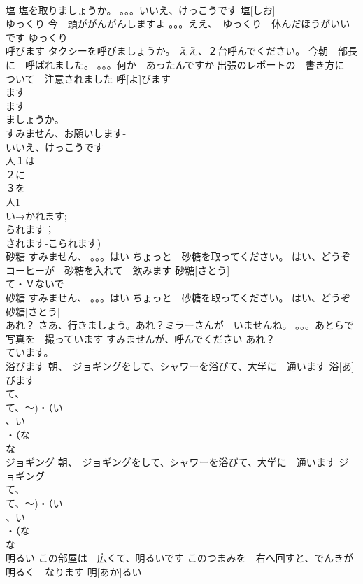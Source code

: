 \documentclass[8pt]{extreport}
\begin{document}
\begin{CJK}{UTF8}{min}
\\	塩	塩を取りましょうか。 。。。いいえ、けっこうです	塩[しお]					
\\	ゆっくり	今　頭ががんがんしますよ 。。。ええ、　ゆっくり　休んだほうがいいです	ゆっくり			
\\	呼びます	タクシーを呼びましょうか。 ええ、２台呼んでください。 今朝　部長に　呼ばれました。 。。。何か　あったんですか 出張のレポートの　書き方に　ついて　注意されました	呼[よ]びます			
\\	ます
\\	ます
\\	ましょうか。
\\	すみません、お願いします- 
\\	いいえ、けっこうです　
\\	人１は　
\\	２に　
\\	３を　
\\	人1 
\\	い→かれます;
\\	られます；
\\	されます-こられます)
\\	砂糖	すみません、 。。。はい ちょっと　砂糖を取ってください。 はい、どうぞ コーヒーが　砂糖を入れて　飲みます	砂糖[さとう]				
\\	て・Ｖないで　
\\	砂糖	すみません、 。。。はい ちょっと　砂糖を取ってください。 はい、どうぞ	砂糖[さとう]					
\\	あれ？	さあ、行きましょう。あれ？ミラーさんが　いませんね。 。。。あとらで　写真を　撮っています すみませんが、呼んでください	あれ？			
\\	ています。
\\	浴びます	朝、　ジョギングをして、シャワーを浴びて、大学に　通います	浴[あ]びます			
\\	て、
\\	て、～)・（い
\\	、い
\\	・（な
\\	な
\\	ジョギング	朝、　ジョギングをして、シャワーを浴びて、大学に　通います	ジョギング			
\\	て、
\\	て、～)・（い
\\	、い
\\	・（な
\\	な
\\	明るい	この部屋は　広くて、明るいです このつまみを　右へ回すと、でんきが　明るく　なります	明[あか]るい			

\end{CJK}
\end{document}

